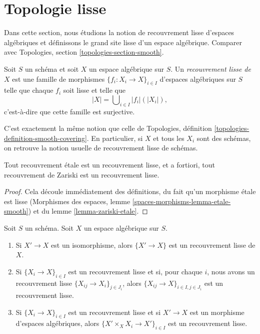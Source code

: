 \section{Topologie lisse}
\label{section-smooth}

\noindent
Dans cette section, nous étudions la notion de recouvrement lisse
d'espaces algébriques et définissons le grand site lisse d'un
espace algébrique. Comparer avec
Topologies, section \ref{topologies-section-smooth}.

\begin{definition}
\label{definition-smooth-covering}
Soit $S$ un schéma et soit $X$ un espace algébrique sur $S$.
Un {\it recouvrement lisse de $X$} est une famille de morphismes
$\{f_i : X_i \to X\}_{i \in I}$ d'espaces algébriques sur $S$
telle que chaque $f_i$ soit lisse
et telle que
$$
|X| = \bigcup\nolimits_{i \in I} |f_i|(|X_i|),
$$
c'est-à-dire que cette famille est surjective.
\end{definition}

\noindent
C'est exactement la même notion que celle de
Topologies, définition \ref{topologies-definition-smooth-covering}.
En particulier, si $X$ et tous les $X_i$ sont des schémas, on retrouve la
notion usuelle de recouvrement lisse de schémas.

\begin{lemma}
\label{lemma-zariski-etale-smooth}
Tout recouvrement \'etale est un recouvrement lisse, et a fortiori,
tout recouvrement de Zariski est un recouvrement lisse.
\end{lemma}

\begin{proof}
Cela découle immédiatement des définitions, du fait qu'un morphisme \'etale
est lisse (Morphismes des espaces, lemme
\ref{spaces-morphisms-lemma-etale-smooth}) et du lemme
\ref{lemma-zariski-etale}.
\end{proof}

\begin{lemma}
\label{lemma-smooth}
Soit $S$ un schéma.
Soit $X$ un espace algébrique sur $S$.
\begin{enumerate}
\item Si $X' \to X$ est un isomorphisme, alors $\{X' \to X\}$
est un recouvrement lisse de $X$.
\item Si $\{X_i \to X\}_{i\in I}$ est un recouvrement lisse et si, pour chaque
$i$, nous avons un recouvrement lisse $\{X_{ij} \to X_i\}_{j\in J_i}$, alors
$\{X_{ij} \to X\}_{i \in I, j\in J_i}$ est un recouvrement lisse.
\item Si $\{X_i \to X\}_{i\in I}$ est un recouvrement lisse
et si $X' \to X$ est un morphisme d'espaces algébriques, alors
$\{X' \times_X X_i \to X'\}_{i\in I}$ est un recouvrement lisse.
\end{enumerate}
\end{lemma}

